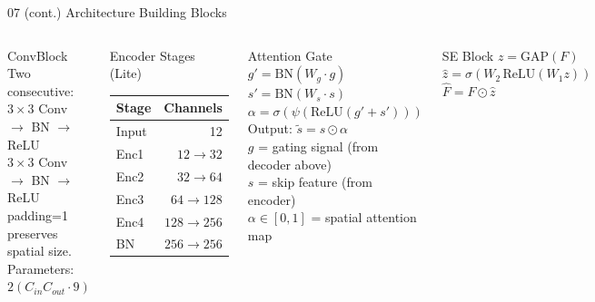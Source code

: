 ﻿\documentclass[aspectratio=169,t]{beamer}
\begin{document}
\begin{frame}{07 (cont.) Architecture Building Blocks}
\begin{columns}[t]
\begin{block}{ConvBlock}
\small Two consecutive:\\
$3\!\times\!3$ Conv $\to$ BN $\to$ ReLU\\
$3\!\times\!3$ Conv $\to$ BN $\to$ ReLU\\[0.1cm]
\textcolor{textsecondary}{padding=1 preserves spatial size.}\\
\textcolor{textsecondary}{Parameters:}
$2(C_{in} C_{out} \cdot 9)$
\end{block}
\vspace{0.2cm}
\begin{block}{Encoder Stages (Lite)}
\small
\begin{tabular}{lr}
Stage & Channels \\
\hline
Input  & 12 \\
Enc1  & $12 \to 32$ \\
Enc2  & $32 \to 64$ \\
Enc3  & $64 \to 128$ \\
Enc4  & $128 \to 256$ \\
BN    & $256 \to 256$ \\
\end{tabular}
\end{block}
\begin{block}{Attention Gate}
\small
$g' = \text{BN}(W_g \cdot g)$\\
$s' = \text{BN}(W_s \cdot s)$\\
$\alpha = \sigma\!\left(\psi\!\left(\text{ReLU}(g'+s')\right)\!\right)$\\
Output: $\tilde{s} = s \odot \alpha$\\[0.1cm]
\textcolor{textsecondary}{$g$ = gating signal (from decoder above)}\\
\textcolor{textsecondary}{$s$ = skip feature (from encoder)}\\
\textcolor{textsecondary}{$\alpha \in [0,1]$ = spatial attention map}
\end{block}
\vspace{0.15cm}
\begin{block}{SE Block}
\small
$z = \text{GAP}(F)$\\
$\hat{z} = \sigma(W_2\,\text{ReLU}(W_1 z))$\\
$\hat{F} = F \odot \hat{z}$\\

\end{block}
\end{columns}
\end{frame}
\end{document}
